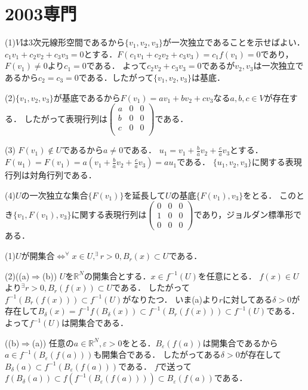 \documentclass[
		book,
		head_space=20mm,
		foot_space=20mm,
		gutter=10mm,
		line_length=190mm
]{jlreq}
\begin{document}
\section{2003専門}
(1)$V$は$3$次元線形空間であるから$\{ v_1,v_2,v_3\}$が一次独立であることを示せばよい．
$c_1v_1+c_2v_2+c_3v_3=0$とする．$F(c_1v_1+c_2v_2+c_3v_3)=c_1f(v_1)=0$であり，$F(v_1)\neq 0$より$c_1=0$である．
よって$c_2v_2+c_3v_3=0$であるが$v_2,v_3$は一次独立であるから$c_2=c_3=0$である．したがって$\{ v_1,v_2,v_3\}$は基底．

(2)$\{ v_1,v_2,v_3\}$が基底であるから$F(v_1)=av_1+bv_2+cv_3$なる$a,b,c\in V$が存在する．
したがって表現行列は$\begin{pmatrix}
a&0&0\\
b&0&0\\
c&0&0\\
\end{pmatrix}$である．

(3)
$F(v_1)\notin U$であるから$a\neq 0$である．
$u_1=v_1+\frac{b}{a}v_2+\frac{c}{a}v_3$とする．
$F(u_1)=F(v_1)=a(v_1+\frac{b}{a}v_2+\frac{c}{a}v_3)=au_1$である．
$\{u_1,v_2,v_3\}$に関する表現行列は対角行列である．

(4)$U$の一次独立な集合$\{F(v_1)\}$を延長して$U$の基底$\{ F(v_1),v_3\}$をとる．
このとき$\{v_1,F(v_1),v_3\}$に関する表現行列は$\begin{pmatrix}
0&0&0\\
1&0&0\\
0&0&0
\end{pmatrix}$であり，ジョルダン標準形である．

(1)$U$が開集合$\Leftrightarrow ^\forall x\in U,^\exists r>0,B_r(x)\subset U$である．

(2)((a)$\Rightarrow$(b))
$U$を$\mathbb{R}^N$の開集合とする．$x\in f^{-1}(U)$を任意にとる．
$f(x)\in U$より$^\exists r>0,B_r(f(x))\subset U$である．
したがって$f^{-1}(B_r(f(x)))\subset f^{-1}(U)$がなりたつ．
いま(a)より$r$に対してある$\delta>0$が存在して$B_\delta(x)=f^{-1}f(B_\delta(x))\subset f^{-1}(B_{r}(f(x)))\subset f^{-1}(U)$である．
よって$f^{-1}(U)$は開集合である．

((b)$\Rightarrow$(a))
任意の$a\in \mathbb{R}^N,\varepsilon>0$をとる．$B_{\varepsilon}(f(a))$は開集合であるから
$a\in f^{-1}(B_{\varepsilon}(f(a)))$も開集合である．
したがってある$\delta>0$が存在して$B_\delta(a)\subset f^{-1}(B_{\varepsilon}(f(a)))$である．
$f$で送って$f(B_\delta(a))\subset f(f^{-1}(B_{\varepsilon}(f(a))))\subset B_{\varepsilon}(f(a))$である．
\end{document}
